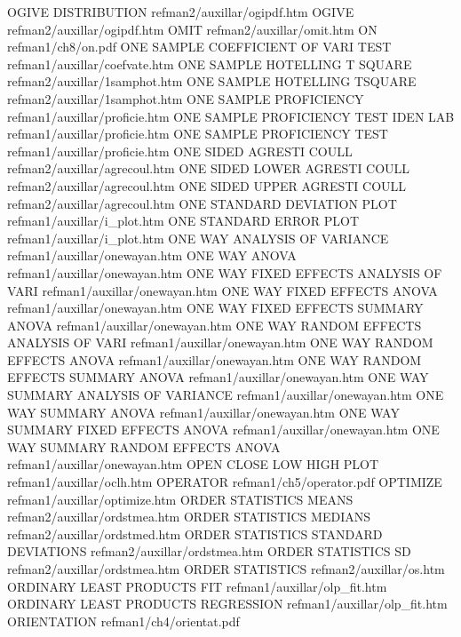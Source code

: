 OGIVE DISTRIBUTION                      refman2/auxillar/ogipdf.htm
OGIVE                                   refman2/auxillar/ogipdf.htm
OMIT                                    refman2/auxillar/omit.htm
ON                                      refman1/ch8/on.pdf
ONE SAMPLE COEFFICIENT OF VARI TEST     refman1/auxillar/coefvate.htm
ONE SAMPLE HOTELLING T SQUARE           refman2/auxillar/1samphot.htm
ONE SAMPLE HOTELLING TSQUARE            refman2/auxillar/1samphot.htm
ONE SAMPLE PROFICIENCY                  refman1/auxillar/proficie.htm
ONE SAMPLE PROFICIENCY TEST IDEN LAB    refman1/auxillar/proficie.htm
ONE SAMPLE PROFICIENCY TEST             refman1/auxillar/proficie.htm
ONE SIDED AGRESTI COULL                 refman2/auxillar/agrecoul.htm
ONE SIDED LOWER AGRESTI COULL           refman2/auxillar/agrecoul.htm
ONE SIDED UPPER AGRESTI COULL           refman2/auxillar/agrecoul.htm
ONE STANDARD DEVIATION PLOT             refman1/auxillar/i_plot.htm
ONE STANDARD ERROR PLOT                 refman1/auxillar/i_plot.htm
ONE WAY ANALYSIS OF VARIANCE            refman1/auxillar/onewayan.htm
ONE WAY ANOVA                           refman1/auxillar/onewayan.htm
ONE WAY FIXED EFFECTS ANALYSIS OF VARI  refman1/auxillar/onewayan.htm
ONE WAY FIXED EFFECTS ANOVA             refman1/auxillar/onewayan.htm
ONE WAY FIXED EFFECTS SUMMARY ANOVA     refman1/auxillar/onewayan.htm
ONE WAY RANDOM EFFECTS ANALYSIS OF VARI refman1/auxillar/onewayan.htm
ONE WAY RANDOM EFFECTS ANOVA            refman1/auxillar/onewayan.htm
ONE WAY RANDOM EFFECTS SUMMARY ANOVA    refman1/auxillar/onewayan.htm
ONE WAY SUMMARY ANALYSIS OF VARIANCE    refman1/auxillar/onewayan.htm
ONE WAY SUMMARY ANOVA                   refman1/auxillar/onewayan.htm
ONE WAY SUMMARY FIXED EFFECTS ANOVA     refman1/auxillar/onewayan.htm
ONE WAY SUMMARY RANDOM EFFECTS ANOVA    refman1/auxillar/onewayan.htm
OPEN CLOSE LOW HIGH PLOT                refman1/auxillar/oclh.htm
OPERATOR                                refman1/ch5/operator.pdf
OPTIMIZE                                refman1/auxillar/optimize.htm
ORDER STATISTICS MEANS                  refman2/auxillar/ordstmea.htm
ORDER STATISTICS MEDIANS                refman2/auxillar/ordstmed.htm
ORDER STATISTICS STANDARD DEVIATIONS    refman2/auxillar/ordstmea.htm
ORDER STATISTICS SD                     refman2/auxillar/ordstmea.htm
ORDER STATISTICS                        refman2/auxillar/os.htm
ORDINARY LEAST PRODUCTS FIT             refman1/auxillar/olp_fit.htm
ORDINARY LEAST PRODUCTS REGRESSION      refman1/auxillar/olp_fit.htm
ORIENTATION                             refman1/ch4/orientat.pdf
